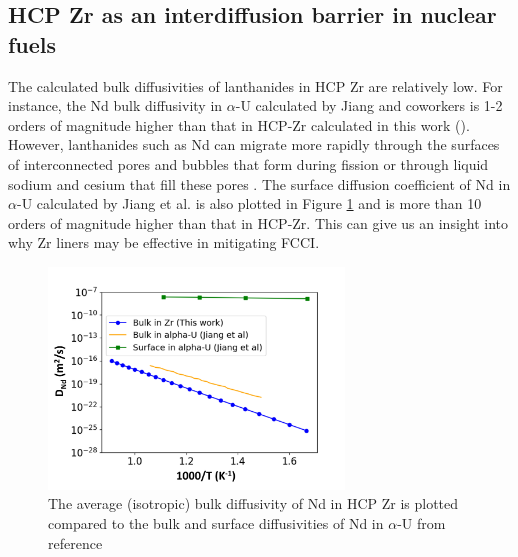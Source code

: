 \documentclass[preprint,12pt]{elsarticle}
\begin{document}
\subsection{HCP Zr as an interdiffusion barrier in nuclear fuels}

The calculated bulk diffusivities of lanthanides in HCP Zr are relatively low. For instance, the Nd bulk diffusivity in $\alpha$-U calculated by Jiang and coworkers \cite{jiang_bulk_2021} is 1-2 orders of magnitude higher than that in HCP-Zr calculated in this work (). However, lanthanides such as Nd can migrate more rapidly through the surfaces of interconnected pores and bubbles that form during fission or through liquid sodium and cesium that fill these pores \cite{matthews_fuel-cladding_2017}. 
The surface diffusion coefficient of Nd in $\alpha$-U calculated by Jiang et al. \cite{jiang_bulk_2021} is also plotted in Figure \ref{fig:nd_av_diff_alphaU} and is more than 10 orders of magnitude higher than that in HCP-Zr. This can give us an insight into why Zr liners may be effective in mitigating FCCI.

\begin{figure}[h!]
    \centering
    \includegraphics[width=0.7\textwidth]{9_nd_diff_zr_vs_alphaU_updated.jpg}
    \caption{The average (isotropic) bulk diffusivity of Nd in HCP Zr is plotted compared to the bulk and surface diffusivities of Nd in $\alpha$-U from reference \cite{jiang_bulk_2021}}
    \label{fig:nd_av_diff_alphaU}
\end{figure}
\FloatBarrier
\end{document}

